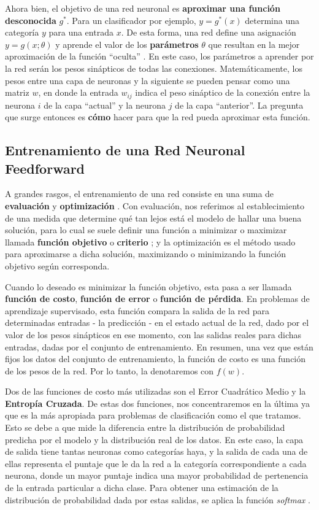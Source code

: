 \documentclass[aps,twocolumn,groupedaddress]{revtex4-2}
\begin{document}
Ahora bien, el objetivo de una red neuronal es \textbf{aproximar una función desconocida} \(g^*\). Para un clasificador por ejemplo, \(y=g^*(x)\) determina una categoría \(y\) para una entrada \(x\). De esta forma, una red define una asignación \(y=g(x; \theta)\) y aprende el valor de los \textbf{parámetros} \(\theta\) que resultan en la mejor aproximación de la función ``oculta'' \cite{deep-learning}. En este caso, los parámetros a aprender por la red serán los pesos sinápticos de todas las conexiones. Matemáticamente, los pesos entre una capa de neuronas y la siguiente se pueden pensar como una matriz \(w\), en donde la entrada \(w_{ij}\) indica el peso sináptico de la conexión entre la neurona \(i\) de la capa ``actual'' y la neurona \(j\) de la capa ``anterior''. La pregunta que surge entonces es \textbf{cómo} hacer para que la red pueda aproximar esta función.

\subsection{Entrenamiento de una Red Neuronal Feedforward}
A grandes rasgos, el entrenamiento de una red consiste en una suma de \textbf{evaluación} y \textbf{optimización} \cite{pedro-domingos}. Con evaluación, nos referimos al establecimiento de una medida que determine qué tan lejos está el modelo de hallar una buena solución, para lo cual se suele definir una función a minimizar o maximizar llamada \textbf{función objetivo} o \textbf{criterio} \cite{deep-learning}; y la optimización es el método usado para aproximarse a dicha solución, maximizando o minimizando la función objetivo según corresponda.

Cuando lo deseado es minimizar la función objetivo, esta pasa a ser llamada \textbf{función de costo}, \textbf{función de error} o \textbf{función de pérdida}. En problemas de aprendizaje supervisado, esta función compara la salida de la red para determinadas entradas - la predicción - en el estado actual de la red, dado por el valor de los pesos sinápticos en ese momento, con las salidas reales para dichas entradas, dadas por el conjunto de entrenamiento. En resumen, una vez que están fijos los datos del conjunto de entrenamiento, la función de costo es una función de los pesos de la red. Por lo tanto, la denotaremos con \(f(w)\).

Dos de las funciones de costo más utilizadas son el Error Cuadrático Medio y la \textbf{Entropía Cruzada}. De estas dos funciones, nos concentraremos en la última ya que es la más apropiada para problemas de clasificación como el que tratamos. Esto se debe a que mide la diferencia entre la distribución de probabilidad predicha por el modelo y la distribución real de los datos.  En este caso, la capa de salida tiene tantas neuronas como categorías haya, y la salida de cada una de ellas representa el puntaje que le da la red a la categoría correspondiente a cada neurona, donde un mayor puntaje indica una mayor probabilidad de pertenencia de la entrada particular a dicha clase. Para obtener una estimación de la distribución de probabilidad dada por estas salidas, se aplica la función \textit{softmax} \cite{hands-on-ML-sklearn-tf}.
\end{document}
